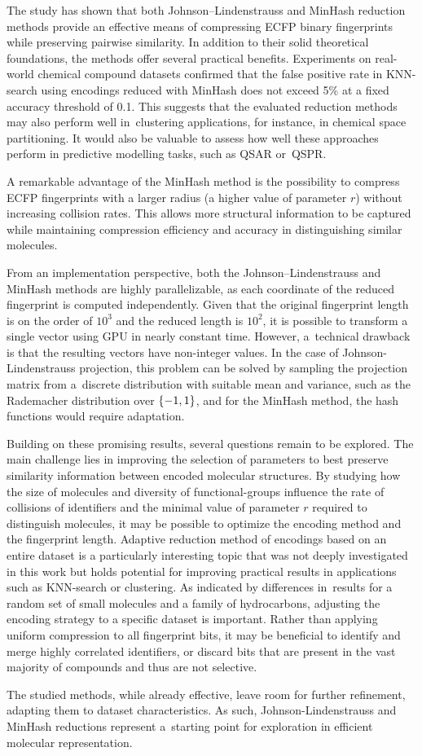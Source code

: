 The study has shown that both Johnson–Lindenstrauss and MinHash reduction methods provide an effective means of compressing ECFP binary fingerprints while preserving pairwise similarity. In addition to their solid theoretical foundations, the methods offer several practical benefits. Experiments on real-world chemical compound datasets confirmed that the false positive rate in KNN-search using encodings reduced with MinHash does not exceed 5\% at a fixed accuracy threshold of 0.1. This suggests that the evaluated reduction methods may also perform well in~clustering applications, for instance, in chemical space partitioning. It would also be valuable to assess how well these approaches perform in predictive modelling tasks, such as QSAR or~QSPR.

A remarkable advantage of the MinHash method is the possibility to compress ECFP fingerprints with a larger radius (a higher value of parameter \( r \)) without increasing collision rates. This allows more structural information to be captured while maintaining compression efficiency and accuracy in distinguishing similar molecules.

From an implementation perspective, both the Johnson–Lindenstrauss and MinHash methods are highly parallelizable, as each coordinate of the reduced fingerprint is computed independently. Given that the original fingerprint length is on the order of \( 10^3 \) and the reduced length is \( 10^2 \), it is possible to transform a single vector using GPU in nearly constant time. However, a~technical drawback is that the resulting vectors have non-integer values. In the case of Johnson-Lindenstrauss projection, this problem can be solved by sampling the projection matrix from a~discrete distribution with suitable mean and variance, such as the Rademacher distribution over \( \left\{ -1, 1 \right\} \), and for the MinHash method, the hash functions would require adaptation.

Building on these promising results, several questions remain to be explored. The main challenge lies in improving the selection of parameters to best preserve similarity information between encoded molecular structures. By studying how the size of molecules and diversity of functional-groups influence the rate of collisions of identifiers and the minimal value of parameter \( r \) required to distinguish molecules, it may be possible to optimize the encoding method and the fingerprint length. Adaptive reduction method of encodings based on an entire dataset is a particularly interesting topic that was not deeply investigated in this work but holds potential for improving practical results in applications such as KNN-search or clustering. As indicated by differences in~results for a random set of small molecules and a family of hydrocarbons, adjusting the encoding strategy to a specific dataset is important. Rather than applying uniform compression to all fingerprint bits, it may be beneficial to identify and merge highly correlated identifiers, or discard bits that are present in the vast majority of compounds and thus are not selective.

The studied methods, while already effective, leave room for further refinement, adapting them to dataset characteristics. As such, Johnson-Lindenstrauss and MinHash reductions represent a~starting point for exploration in efficient molecular representation.